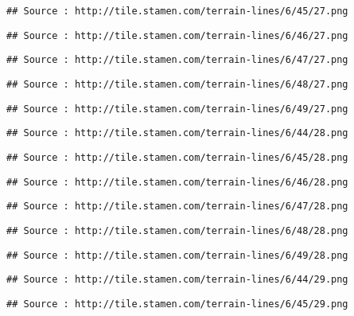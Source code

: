 \documentclass[
]{article}
\begin{document}
\begin{verbatim}
## Source : http://tile.stamen.com/terrain-lines/6/45/27.png
\end{verbatim}

\begin{verbatim}
## Source : http://tile.stamen.com/terrain-lines/6/46/27.png
\end{verbatim}

\begin{verbatim}
## Source : http://tile.stamen.com/terrain-lines/6/47/27.png
\end{verbatim}

\begin{verbatim}
## Source : http://tile.stamen.com/terrain-lines/6/48/27.png
\end{verbatim}

\begin{verbatim}
## Source : http://tile.stamen.com/terrain-lines/6/49/27.png
\end{verbatim}

\begin{verbatim}
## Source : http://tile.stamen.com/terrain-lines/6/44/28.png
\end{verbatim}

\begin{verbatim}
## Source : http://tile.stamen.com/terrain-lines/6/45/28.png
\end{verbatim}

\begin{verbatim}
## Source : http://tile.stamen.com/terrain-lines/6/46/28.png
\end{verbatim}

\begin{verbatim}
## Source : http://tile.stamen.com/terrain-lines/6/47/28.png
\end{verbatim}

\begin{verbatim}
## Source : http://tile.stamen.com/terrain-lines/6/48/28.png
\end{verbatim}

\begin{verbatim}
## Source : http://tile.stamen.com/terrain-lines/6/49/28.png
\end{verbatim}

\begin{verbatim}
## Source : http://tile.stamen.com/terrain-lines/6/44/29.png
\end{verbatim}

\begin{verbatim}
## Source : http://tile.stamen.com/terrain-lines/6/45/29.png
\end{verbatim}
\end{document}
